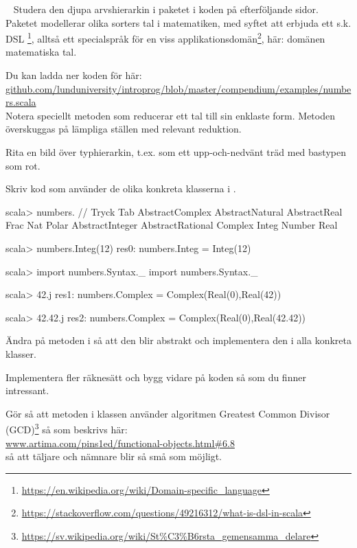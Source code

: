 








\QUESTBEGIN

\Task  \what~ Studera den djupa arvshierarkin i paketet  i koden på efterföljande sidor. Paketet   modellerar olika sorters tal i matematiken, med syftet att erbjuda ett s.k. DSL \footnote{\url{https://en.wikipedia.org/wiki/Domain-specific_language}}, alltså ett specialspråk för en viss applikationsdomän\footnote{\url{https://stackoverflow.com/questions/49216312/what-is-dsl-in-scala}}, här: domänen matematiska tal.

Du kan ladda ner koden för  här: \\
\href{https://github.com/lunduniversity/introprog/blob/master/compendium/examples/numbers.scala}{github.com/lunduniversity/introprog/blob/master/compendium/examples/numbers.scala}
\\ Notera speciellt metoden  som reducerar ett tal till sin enklaste form. Metoden  överskuggas på lämpliga ställen med relevant reduktion.

\Subtask Rita en bild över typhierarkin, t.ex. som ett upp-och-nedvänt träd med bastypen   som rot.

\Subtask Skriv kod som använder de olika konkreta klasserna i . 
\begin{REPL}
scala> numbers.  // Tryck Tab
AbstractComplex   AbstractNatural    AbstractReal   Frac    Nat      Polar
AbstractInteger   AbstractRational   Complex        Integ   Number   Real

scala> numbers.Integ(12)
res0: numbers.Integ = Integ(12)

scala> import numbers.Syntax._
import numbers.Syntax._

scala> 42.j
res1: numbers.Complex = Complex(Real(0),Real(42))

scala> 42.42.j
res2: numbers.Complex = Complex(Real(0),Real(42.42))

\end{REPL}

\Subtask Ändra på metoden \code{+} i  så att den blir abstrakt och implementera den i alla konkreta klasser.

\Subtask Implementera fler räknesätt och bygg vidare på koden så som du finner intressant.

\Subtask Gör så att metoden  i klassen  använder algoritmen Greatest Common Divisor (GCD)\footnote{\url{https://sv.wikipedia.org/wiki/St\%C3\%B6rsta\_gemensamma\_delare}} så som beskrivs här: \\ \href{http://www.artima.com/pins1ed/functional-objects.html#6.8}{www.artima.com/pins1ed/functional-objects.html\#6.8} \\ så att täljare och nämnare blir så små som möjligt.


\SOLUTION


\QUESTEND
